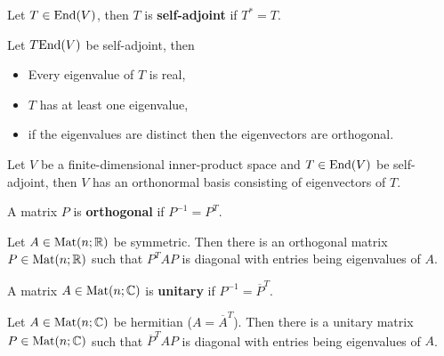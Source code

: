 \begin{multicols}{2}
\begin{definition}
Let $T\in\mathrm{End}(V)$, then $T$ is \textbf{self-adjoint} if $T^*=T$.
\end{definition}

\begin{theorem}[5.3.7]
Let $T\mathrm{End}(V)$ be self-adjoint, then
    \begin{itemize}
        \item Every eigenvalue of $T$ is real,
        \item $T$ has at least one eigenvalue,
        \item if the eigenvalues are distinct then the eigenvectors are orthogonal.
    \end{itemize}
\end{theorem}

\begin{theorem}[Spectral]
Let $V$ be a finite-dimensional inner-product space and $T\in\mathrm{End}(V)$ be self-adjoint, then $V$ has an orthonormal basis consisting of eigenvectors of $T$.
\end{theorem}

\begin{definition}
A matrix $P$ is \textbf{orthogonal} if $P^{-1}=P^T$.
\end{definition}

\begin{theorem}[Spectral II]
Let $A\in\mathrm{Mat}(n;\mathbb{R})$ be symmetric. Then there is an orthogonal matrix $P\in\mathrm{Mat}(n;\mathbb{R})$ such that $P^TAP$ is diagonal with entries being eigenvalues of $A$.
\end{theorem}

\begin{definition}
A matrix $A\in\mathrm{Mat}(n;\mathbb{C})$ is \textbf{unitary} if $P^{-1}=\overline{P}^T$.
\end{definition}

\begin{theorem}
Let $A\in\mathrm{Mat}(n;\mathbb{C})$ be hermitian ($A=\overline{A}^T$). Then there is a unitary matrix $P\in\mathrm{Mat}(n;\mathbb{C})$ such that $\overline{P}^TAP$ is diagonal with entries being eigenvalues of $A$.
\end{theorem}

\end{multicols}
